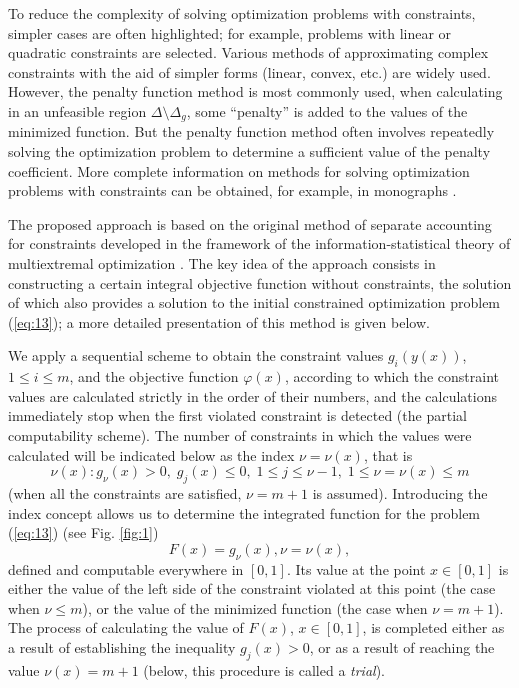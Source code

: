 \documentclass[smallextended]{svjour3}       %
\begin{document}
To reduce the complexity of solving optimization problems with constraints, simpler cases are often highlighted; for example, problems with linear or quadratic constraints are selected. Various methods of approximating complex constraints with the aid of simpler forms (linear, convex, etc.) are widely used. However, the penalty function method is most commonly used, when calculating in an unfeasible region $\Delta \setminus \Delta_g$, some ``penalty'' is added to the values of the minimized function. But the penalty function method often involves repeatedly solving the optimization problem to determine a sufficient value of the penalty coefficient. More complete information on methods for solving optimization problems with constraints can be obtained, for example, in monographs \cite{c18,c26,c27,c28,c29}.

The proposed approach is based on the original method of separate accounting for constraints developed in the framework of the information-statistical theory of multiextremal optimization \cite{c18}. The key idea of the approach consists in constructing a certain integral objective function without constraints, the solution of which also provides a solution to the initial constrained optimization problem (\ref{eq:13}); a more detailed presentation of this method is given below.

We apply a sequential scheme to obtain the constraint values $g_i(y(x))$, $1 \leq i \leq m$, and the objective function $\varphi(x)$, according to which the constraint values are calculated strictly in the order of their numbers, and the calculations immediately stop when the first violated constraint is detected (the partial computability scheme). The number of constraints in which the values were calculated will be indicated below as the index $\nu=\nu(x)$, that is
\begin{equation}\label{eq:15}
\nu(x) : g_\nu(x)>0,\; g_j(x)\leq 0,\; 1 \leq j\leq \nu - 1,\; 1\leq \nu = \nu(x) \leq m
\end{equation}
 (when all the constraints are satisfied, $\nu=m+1$ is assumed). Introducing the index concept allows us to determine the integrated function for the problem (\ref{eq:13}) (see Fig. \ref{fig:1})
\begin{equation}\label{eq:16}
F(x)=g_\nu(x), \nu=\nu(x),
\end{equation}
defined and computable everywhere in $[0,1]$. Its value at the point $x\in [0,1]$ is either the value of the left side of the constraint violated at this point (the case when $\nu \leq m$), or the value of the minimized function (the case when $\nu = m + 1$). The process of calculating the value of $F(x)$, $x\in [0,1]$, is completed either as a result of establishing the inequality $g_j(x)>0$, or as a result of reaching the value $\nu(x)=m+1$ (below, this procedure is called a \textit{trial}).
\end{document}
